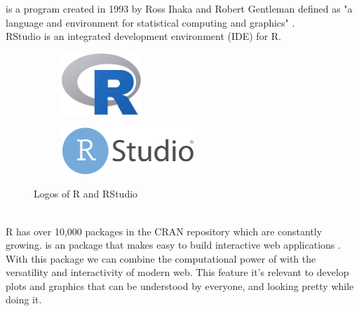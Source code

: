 \textbf{\R}  is a program created in 1993 by Ross Ihaka and Robert Gentleman  defined as
"a language and environment for statistical computing and graphics" \cite{R-project website}.
\\
 RStudio is an integrated development environment (IDE) for R. \cite{rstudio}
\begin{figure}
\centering
\begin{subfigure}{.5\textwidth}
  \centering
  \includegraphics[width=3cm]{images/R.jpg}
  \label{fig:sub1}
\end{subfigure}%
\begin{subfigure}{.5\textwidth}
  \centering
  \includegraphics[width=5cm]{images/Rstudio.png}
  \label{fig:sub2}
\end{subfigure}
\caption{Logos of R and RStudio}
\label{fig:test}
\end{figure}
\\
R has over 10,000 packages in the CRAN repository which are constantly growing. 
\textbf{\Shiny} is an \R package that makes easy to build interactive web applications \cite{shiny} .
\\
With this package we can combine the computational power of \R with the versatility and interactivity of modern web. This feature it's relevant to develop plots and graphics that can be understood by everyone, and looking pretty while doing it.

